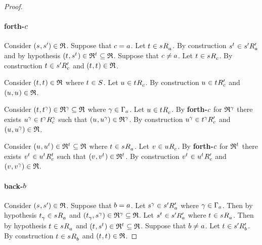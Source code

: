 \begin{proof}
\paragraph{forth-$\agentC$}
Consider $(\kStateS, \kStateSP) \in \refinement$.
Suppose that $\agentC = \agentA$.
Let $\kStateT \in \kSuccessorsA{\kStateS}$.
By construction $\kStateS[\kStateT] \in \kSuccessorsPA{\kStateSP}$ and by hypothesis $(\kStateT, \kStateS[\kStateT]) \in \refinement^{\kStateT} \subseteq \refinement$.
Suppose that $\agentC \neq \agentA$.
Let $\kStateT \in \kSuccessorsC{\kStateS}$.
By construction $\kStateT \in \kSuccessorsPC{\kStateSP}$ and $(\kStateT, \kStateT) \in \refinement$.

Consider $(\kStateT, \kStateT) \in \refinement$ where $\kStateT \in \kStates$.
Let $\kStateU \in \kSuccessorsC{\kStateT}$.
By construction $\kStateU \in \kSuccessorsPC{\kStateT}$ and $(\kStateU, \kStateU) \in \refinement$.

Consider $(\kStateT, \kStateT[\gamma]) \in \refinement^\gamma \subseteq \refinement$ where $\gamma \in \Gamma_\agentA$.
Let $\kStateU \in \kSuccessorsC{\kStateT}$.
By {\bf forth-$\agentC$} for $\refinement^\gamma$ there exists $\kStateU[\gamma] \in \kSuccessorsC[\gamma]{\kStateT[\gamma]}$ such that $(\kStateU, \kStateU[\gamma]) \in \refinement^\gamma$.
By construction $\kStateU[\gamma] \in \kSuccessorsPC{\kStateT[\gamma]}$ and $(\kStateU, \kStateU[\gamma]) \in \refinement$.

Consider $(\kStateU, \kStateU[\kStateT]) \in \refinement^{\kStateT} \subseteq \refinement$ where $\kStateT \in \kSuccessorsA{\kStateS}$.
Let $\kStateV \in \kSuccessorsC{\kStateU}$.
By {\bf forth-$\agentC$} for $\refinement^{\kStateT}$ there exists $\kStateV[\kStateT] \in \kSuccessorsC[\kStateT]{\kStateU[\kStateT]}$ such that $(\kStateV, \kStateV[\kStateT]) \in \refinement^{\kStateT}$.
By construction $\kStateV[\kStateT] \in \kSuccessorsPC{\kStateU[\kStateT]}$ and $(\kStateV, \kStateV[\gamma]) \in \refinement$.

\paragraph{back-$\agentB$}

Consider $(\kStateS, \kStateSP) \in \refinement$.
Suppose that $\agentB = \agentA$.
Let $\kStateS[\gamma] \in \kSuccessorsPA{\kStateSP}$ where $\gamma \in \Gamma_\agentA$.
Then by hypothesis $\kStateT_\gamma \in \kSuccessorsA{\kStateS}$ and $(\kStateT_\gamma, \kStateS[\gamma]) \in \refinement^\gamma \subseteq \refinement$.
Let $\kStateS[\kStateT] \in \kSuccessorsPA{\kStateSP}$ where $\kStateT \in \kSuccessorsA{\kStateS}$.
Then by hypothesis $\kStateT \in \kSuccessorsA{\kStateS}$ and $(\kStateT, \kStateS[\kStateT]) \in \refinement^{\kStateT} \subseteq \refinement$.
Suppose that $\agentB \neq \agentA$.
Let $\kStateT \in \kSuccessorsPB{\kStateSP}$.
By construction $\kStateT \in \kSuccessorsB{\kStateS}$ and $(\kStateT, \kStateT) \in \refinement$.


\end{proof}
